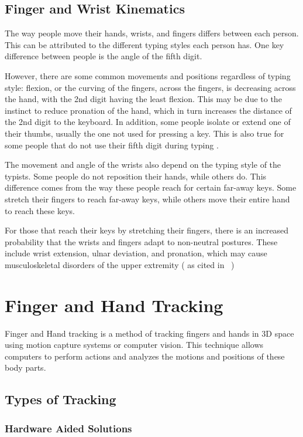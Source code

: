 \documentclass{report}
\begin{document}
\subsection{Finger and Wrist Kinematics}
The way people move their hands, wrists, and fingers differs between each
person. This can be attributed to the different typing styles each person has.
One key difference between people is the angle of the fifth digit.

However, there are some common movements and positions regardless of typing
style: flexion, or the curving of the fingers, across the fingers, is decreasing
across the hand, with the 2nd digit having the least flexion. This may be due to
the instinct to reduce pronation of the hand, which in turn increases the
distance of the 2nd digit to the keyboard. In addition, some people isolate or
extend one of their thumbs, usually the one not used for pressing a key. This is
also true for some people that do not use their fifth digit during typing
\parencite{baker2007}.

The movement and angle of the wrists also depend on the typing style of the
typists. Some people do not reposition their hands, while others do. This
difference comes from the way these people reach for certain far-away keys. Some
stretch their fingers to reach far-away keys, while others move their entire
hand to reach these keys.

For those that reach their keys by stretching their fingers, there is an
increased probability that the wrists and fingers adapt to non-neutral postures.
These include wrist extension, ulnar deviation, and pronation, which may cause
musculoskeletal disorders of the upper extremity (\cite{marklin1999} as cited in
~\cite{baker2007})

\section{Finger and Hand Tracking}
Finger and Hand tracking is a method of tracking fingers and hands in 3D space
using motion capture systems or computer vision. This technique allows computers
to perform actions and analyzes the motions and positions of these body parts.


\subsection{Types of Tracking}

\subsubsection{Hardware Aided Solutions}
\end{document}
